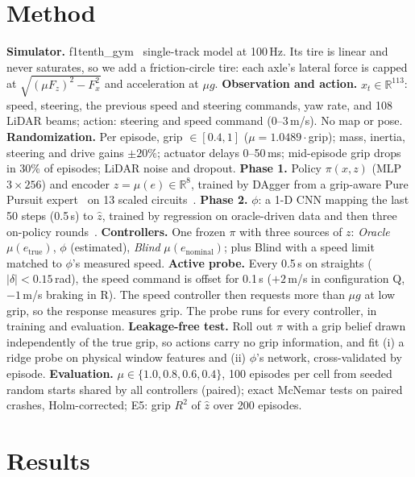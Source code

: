 \documentclass[conference]{IEEEtran}
\newcommand{\phiA}{\ensuremath{\phi}}
\begin{document}
\section{Method}
\textbf{Simulator.} f1tenth\_gym~\cite{okelly2020f1tenth} single-track model at 100\,Hz. Its tire is linear and never saturates, so we add a friction-circle tire: each axle's lateral force is capped at $\sqrt{(\mu F_z)^2-F_x^2}$ and acceleration at $\mu g$.
\textbf{Observation and action.} $x_t\in\mathbb{R}^{113}$: speed, steering, the previous speed and steering commands, yaw rate, and 108 LiDAR beams; action: steering and speed command (0--3\,m/s). No map or pose.
\textbf{Randomization.} Per episode, grip $\in[0.4,1]$ ($\mu=1.0489\cdot$grip); mass, inertia, steering and drive gains $\pm20\%$; actuator delays 0--50\,ms; mid-episode grip drops in 30\% of episodes; LiDAR noise and dropout.
\textbf{Phase 1.} Policy $\pi(x,z)$ (MLP $3\times256$) and encoder $z=\mu(e)\in\mathbb{R}^8$, trained by DAgger from a grip-aware Pure Pursuit expert~\cite{coulter1992purepursuit} on 13 scaled circuits~\cite{betz2022racing}.
\textbf{Phase 2.} \phiA{}: a 1-D CNN mapping the last 50 steps (0.5\,s) to $\hat z$, trained by regression on oracle-driven data and then three on-policy rounds~\cite{kumar2021rma}.
\textbf{Controllers.} One frozen $\pi$ with three sources of $z$: \emph{Oracle} $\mu(e_\text{true})$, \emph{\phiA{}} (estimated), \emph{Blind} $\mu(e_\text{nominal})$; plus Blind with a speed limit matched to \phiA{}'s measured speed.
\textbf{Active probe.} Every 0.5\,s on straights ($|\delta|<0.15$\,rad), the speed command is offset for 0.1\,s ($+2$\,m/s in configuration Q, $-1$\,m/s braking in R). The speed controller then requests more than $\mu g$ at low grip, so the response measures grip. The probe runs for every controller, in training and evaluation.
\textbf{Leakage-free test.} Roll out $\pi$ with a grip belief drawn independently of the true grip, so actions carry no grip information, and fit (i) a ridge probe on physical window features and (ii) \phiA{}'s network, cross-validated by episode.
\textbf{Evaluation.} $\mu\in\{1.0,0.8,0.6,0.4\}$, 100 episodes per cell from seeded random starts shared by all controllers (paired); exact McNemar tests on paired crashes, Holm-corrected; E5: grip $R^2$ of $\hat z$ over 200 episodes.

\section{Results}
\end{document}
